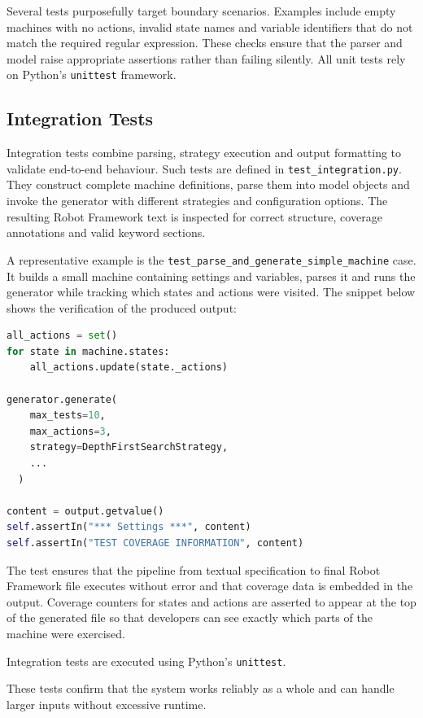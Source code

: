 Several tests purposefully target boundary scenarios. Examples include empty
machines with no actions, invalid state names and variable identifiers that do
not match the required regular expression. These checks ensure that the parser
and model raise appropriate assertions rather than failing silently. All unit tests rely on
Python's \texttt{unittest} framework. 

\subsection{Integration Tests}

Integration tests combine parsing, strategy execution and output formatting to
validate end-to-end behaviour.  Such tests are defined in
\texttt{test\_integration.py}.  They construct complete machine definitions,
parse them into model objects and invoke the generator with different strategies
and configuration options.  The resulting Robot Framework text is inspected for
correct structure, coverage annotations and valid keyword sections.

A representative example is the \texttt{test\_parse\_and\_generate\_simple\_machine}
case.  It builds a small machine containing settings and variables, parses it and
runs the generator while tracking which states and actions were visited.  The
snippet below shows the verification of the produced output:
\begin{lstlisting}[language=python]
all_actions = set()
for state in machine.states:
    all_actions.update(state._actions)

generator.generate(
    max_tests=10,
    max_actions=3,
    strategy=DepthFirstSearchStrategy,
    ...
  )

content = output.getvalue()
self.assertIn("*** Settings ***", content)
self.assertIn("TEST COVERAGE INFORMATION", content)
\end{lstlisting}
The test ensures that the pipeline from textual specification to final Robot
Framework file executes without error and that coverage data is embedded in the
output. Coverage counters for states and actions are asserted to appear at the
top of the generated file so that developers can see exactly which parts of the
machine were exercised.

Integration tests are executed using Python's \texttt{unittest}. 

These tests confirm that the system works reliably as a whole and can
handle larger inputs without excessive runtime.


